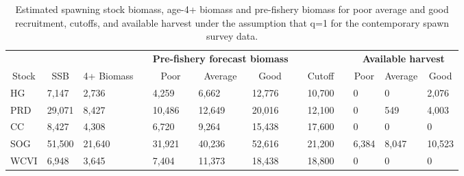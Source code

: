 %
\begin{table}[!tbp]
 \small
 \caption{Estimated spawning stock biomass,  age-4+ biomass and pre-fishery biomass for poor average and good recruitment,  cutoffs, and available harvest under the assumption that q=1 for the contemporary spawn survey data.\label{TableCatchAdviceqFix}} 
 \begin{center}
 \begin{tabular}{lllclllclclll}\hline\hline
\multicolumn{3}{c}{\bfseries }&
\multicolumn{1}{c}{\bfseries }&
\multicolumn{3}{c}{\bfseries Pre-fishery forecast biomass}&
\multicolumn{1}{c}{\bfseries }&
\multicolumn{1}{c}{\bfseries }&
\multicolumn{1}{c}{\bfseries }&
\multicolumn{3}{c}{\bfseries Available harvest}
\tabularnewline \cline{1-13}
\multicolumn{1}{c}{Stock}&\multicolumn{1}{c}{SSB}&\multicolumn{1}{c}{4+ Biomass}&\multicolumn{1}{c}{}&\multicolumn{1}{c}{Poor}&\multicolumn{1}{c}{Average}&\multicolumn{1}{c}{Good}&\multicolumn{1}{c}{}&\multicolumn{1}{c}{Cutoff}&\multicolumn{1}{c}{}&\multicolumn{1}{c}{Poor}&\multicolumn{1}{c}{Average}&\multicolumn{1}{c}{Good}\tabularnewline
\hline
HG& 7,147& 2,736&& 4,259& 6,662&12,776&&10,700&&     0&     0& 2,076\tabularnewline
PRD&29,071& 8,427&&10,486&12,649&20,016&&12,100&&     0&   549& 4,003\tabularnewline
CC& 8,427& 4,308&& 6,720& 9,264&15,438&&17,600&&     0&     0&     0\tabularnewline
SOG&51,500&21,640&&31,921&40,236&52,616&&21,200&& 6,384& 8,047&10,523\tabularnewline
WCVI& 6,948& 3,645&& 7,404&11,373&18,438&&18,800&&     0&     0&     0\tabularnewline
\hline
\end{tabular}

\end{center}

\end{table}

